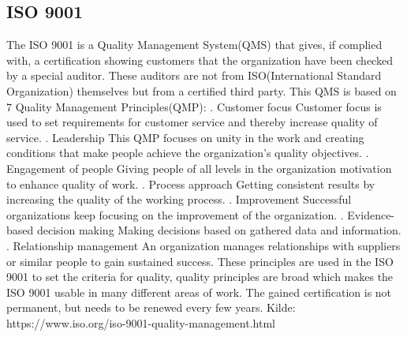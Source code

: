 \subsection{ISO 9001}
The ISO 9001 is a Quality Management System(QMS) that gives, if complied with, a certification showing customers that the organization have been checked by a special auditor. These auditors are not from ISO(International Standard Organization) themselves but from a certified third party.
This QMS is based on 7 Quality Management Principles(QMP):
. Customer focus
\newline
Customer focus is used to set requirements for customer service and thereby increase quality of service.
. Leadership
\newline
This QMP focuses on unity in the work and creating conditions that make people achieve the organization's quality objectives.
. Engagement of people
\newline
Giving people of all levels in the organization motivation to enhance quality of work.
. Process approach
\newline
Getting consistent results by increasing the quality of the working process.
. Improvement
\newline
Successful organizations keep focusing on the improvement of the organization.
. Evidence-based decision making
\newline
Making decisions based on gathered data and information.
. Relationship management
\newline
An organization manages relationships with suppliers or similar people to gain sustained success.
\newline
These principles are used in the ISO 9001 to set the criteria for quality,
quality principles are broad which makes the ISO 9001 usable in many different areas of work.
The gained certification is not permanent, but needs to be renewed every few years.
\newline
Kilde: https://www.iso.org/iso-9001-quality-management.html
\newline
